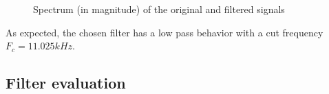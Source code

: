\begin{figure}[!h]%
	\centering
	\qquad
	\caption{Spectrum (in magnitude) of the original and filtered signals}%
	\label{fig:filterMatlabTestbench}%
\end{figure}

As expected, the chosen filter has a low pass behavior with a cut frequency $F_c = 11.025 kHz$.

\subsection{Filter evaluation}

